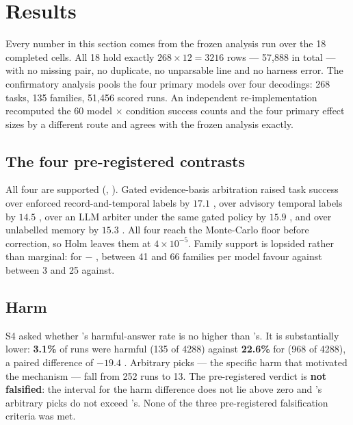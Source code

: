 \section{Results}
\label{sec:results}

Every number in this section comes from the frozen analysis run over the 18 completed cells. All 18 hold exactly
$268\times12=3216$ rows --- 57{,}888 in total --- with no missing pair, no duplicate, no unparsable line and no
harness error. The confirmatory analysis pools the four primary models over four decodings: 268 tasks, 135
families, 51{,}456 scored runs. An independent re-implementation recomputed the 60 model $\times$ condition success
counts and the four primary effect sizes by a different route and agrees with the frozen analysis exactly.




\subsection{The four pre-registered contrasts}

All four are supported (, ). Gated evidence-basis arbitration raised task
success over enforced record-and-temporal labels by $17.1$\pp{} , over advisory temporal labels by
$14.5$\pp{} , over an LLM arbiter under the same gated policy by $15.9$\pp{} , and
over unlabelled memory by $15.3$\pp{} . All four reach the Monte-Carlo floor before correction, so
Holm leaves them at $4\times10^{-5}$. Family support is lopsided rather than marginal: for  $-$
, between 41 and 66 families per model favour  against between 3 and 25 against.

\subsection{Harm}

S4 asked whether 's harmful-answer rate is no higher than 's. It is substantially lower:
\textbf{3.1\%} of  runs were harmful (135 of 4288) against \textbf{22.6\%} for  (968 of 4288),
a paired difference of $-19.4$\pp{} . Arbitrary picks --- the specific harm that motivated the
mechanism --- fall from 252 runs to 13. The pre-registered verdict is \textbf{not falsified}: the interval for the
harm difference does not lie above zero and 's arbitrary picks do not exceed 's. None of the
three pre-registered falsification criteria was met.

